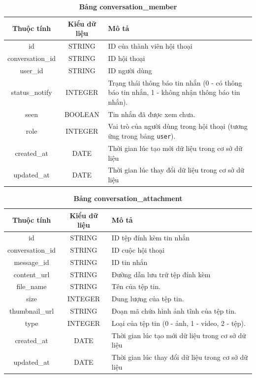 \begin{table}[H]
  \caption{\bfseries \fontsize{12pt}{0pt}\selectfont Bảng conversation\_member}
  \centering
  \begin{tabularx}{0.9\textwidth}{|c|c|X|}
    \hline
    \textbf{Thuộc tính} & \textbf{Kiểu dữ liệu} & \textbf{Mô tả} \\
    \hline
    id & STRING & ID của thành viên hội thoại \\
    \hline
    conversation\_id & STRING & ID hội thoại \\
    \hline
    user\_id & STRING & ID người dùng  \\
    \hline
    status\_notify & INTEGER & Trạng thái thông báo tin nhắn (0 - có thông báo tin nhắn, 1 - không nhận thông báo tin nhắn).\\
    \hline
    seen & BOOLEAN & Tin nhắn đã được xem chưa.\\
    \hline
    role & INTEGER & Vai trò của người dùng trong hội thoại (tương ứng trong bảng \texttt{user}).\\
    \hline
    created\_at & DATE & Thời gian lúc tạo mới dữ liệu trong cơ sở dữ liệu \\
    \hline
    updated\_at & DATE & Thời gian lúc thay đổi dữ liệu trong cơ sở dữ liệu \\
    \hline
  \end{tabularx}
\end{table}


\begin{table}[H]
  \caption{\bfseries \fontsize{12pt}{0pt}\selectfont Bảng conversation\_attachment}
  \centering
  \begin{tabularx}{0.9\textwidth}{|c|c|X|}
    \hline
    \textbf{Thuộc tính} & \textbf{Kiểu dữ liệu} & \textbf{Mô tả} \\
    \hline
    id & STRING & ID tệp đính kèm tin nhắn  \\
    \hline
    conversation\_id & STRING & ID cuộc hội thoại  \\
    \hline
    message\_id & STRING & ID tin nhắn  \\
    \hline
    content\_url & STRING & Đường dẫn lưu trữ tệp đính kèm\\
    \hline
    file\_name & STRING & Tên của tệp tin.\\
    \hline
    size & INTEGER & Dung lượng của tệp tin.\\
    \hline
    thumbnail\_url & STRING & Đoạn mã chứa hình ảnh tĩnh của tệp tin.\\
    \hline
    type & INTEGER & Loại của tệp tin (0 - ảnh, 1 - video, 2 - tệp). \\
    \hline
    created\_at & DATE & Thời gian lúc tạo mới dữ liệu trong cơ sở dữ liệu \\
    \hline
    updated\_at & DATE & Thời gian lúc thay đổi dữ liệu trong cơ sở dữ liệu \\
    \hline
  \end{tabularx}
\end{table}


